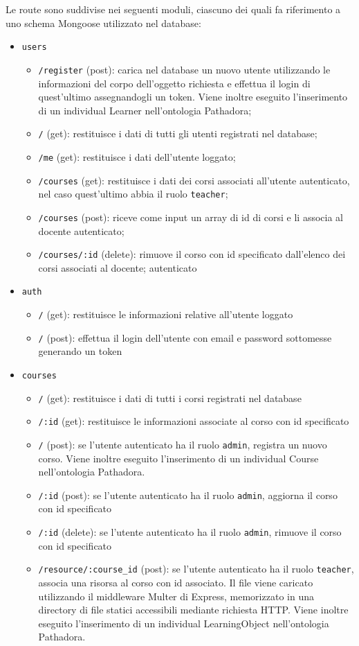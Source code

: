 Le route sono suddivise nei seguenti moduli, ciascuno dei quali fa riferimento a uno schema Mongoose utilizzato nel database:
\begin{itemize}
	\item \texttt{users}
	\begin{itemize}
		\item \texttt{/register} (post): carica nel database un nuovo utente utilizzando le informazioni del corpo dell'oggetto richiesta e effettua il login di quest'ultimo assegnandogli un token. Viene inoltre eseguito l'inserimento di un individual Learner nell'ontologia Pathadora;
		\item \texttt{/} (get): restituisce i dati di tutti gli utenti registrati nel database;
		\item \texttt{/me} (get): restituisce i dati dell'utente loggato;
		\item \texttt{/courses} (get): restituisce i dati dei corsi associati all'utente autenticato, nel caso quest'ultimo abbia il ruolo \texttt{teacher};
		\item \texttt{/courses} (post): riceve come input un array di id di corsi e li associa al docente autenticato;
		\item \texttt{/courses/:id} (delete): rimuove il corso con id specificato dall'elenco dei corsi associati al docente; autenticato
	\end{itemize}
	\item \texttt{auth}
	\begin{itemize}
		\item \texttt{/} (get): restituisce le informazioni relative all'utente loggato
		\item \texttt{/} (post): effettua il login dell'utente con email e password sottomesse generando un token
	\end{itemize}
	\item \texttt{courses}
	\begin{itemize}
		\item \texttt{/} (get): restituisce i dati di tutti i corsi registrati nel database
		\item \texttt{/:id} (get): restituisce le informazioni associate al corso con id specificato
		\item \texttt{/} (post): se l'utente autenticato ha il ruolo \texttt{admin}, registra un nuovo corso. Viene inoltre eseguito l'inserimento di un individual Course nell'ontologia Pathadora.
		\item \texttt{/:id} (post): se l'utente autenticato ha il ruolo \texttt{admin}, aggiorna il corso con id specificato
		\item \texttt{/:id} (delete): se l'utente autenticato ha il ruolo \texttt{admin}, rimuove il corso con id specificato
		\item \texttt{/resource/:course\_id} (post): se l'utente autenticato ha il ruolo \texttt{teacher}, associa una risorsa al corso con id associato. Il file viene caricato utilizzando il middleware Multer di Express, memorizzato in una directory di file statici accessibili mediante richiesta HTTP. Viene inoltre eseguito l'inserimento di un individual LearningObject nell'ontologia Pathadora.
	\end{itemize}
\end{itemize}

